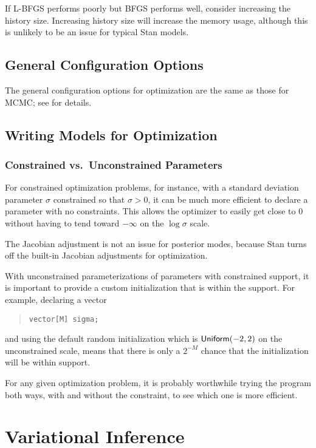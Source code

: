 If L-BFGS performs poorly but BFGS performs well, consider increasing
the history size. Increasing history size will increase the
memory usage, although this is unlikely to be an issue for typical
Stan models.


\section{General Configuration Options}

The general configuration options for optimization are the same as
those for MCMC;  see  for details.


\section{Writing Models for Optimization}

\subsection{Constrained vs.\ Unconstrained Parameters}

For constrained optimization problems, for instance, with a standard
deviation parameter $\sigma$ constrained so that $\sigma > 0$, it can
be much more efficient to declare a parameter  with no
constraints.  This allows the optimizer to easily get close to 0
without having to tend toward $-\infty$ on the $\log \sigma$ scale.

The Jacobian adjustment is not an issue for posterior modes, because
Stan turns off the built-in Jacobian adjustments for optimization.

With unconstrained parameterizations of parameters with constrained
support, it is important to provide a custom initialization that is
within the support.  For example, declaring a vector
%
\begin{quote}
\begin{Verbatim}
vector[M] sigma;
\end{Verbatim}
\end{quote}
%
and using the default random initialization which is
$\distro{Uniform}(-2,2)$ on the unconstrained scale, means that there
is only a $2^{-M}$ chance that the initialization will be within
support.

For any given optimization problem, it is probably worthwhile trying
the program both ways, with and without the constraint, to see which
one is more efficient.


\chapter{Variational Inference}\label{vi-algorithms.chapter}

